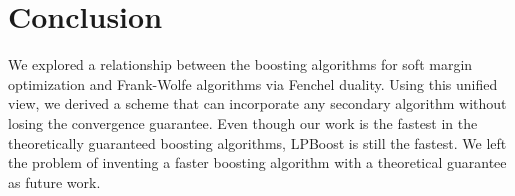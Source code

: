 \section{Conclusion}
\label{sec:conclusion}
We explored a relationship between 
the boosting algorithms for soft margin optimization 
and Frank-Wolfe algorithms via Fenchel duality. 
Using this unified view, 
we derived a scheme 
that can incorporate any secondary algorithm 
without losing the convergence guarantee. 
Even though our work is the fastest 
in the theoretically guaranteed boosting algorithms, 
LPBoost is still the fastest. 
We left the problem of inventing a faster boosting algorithm 
with a theoretical guarantee as future work. 
